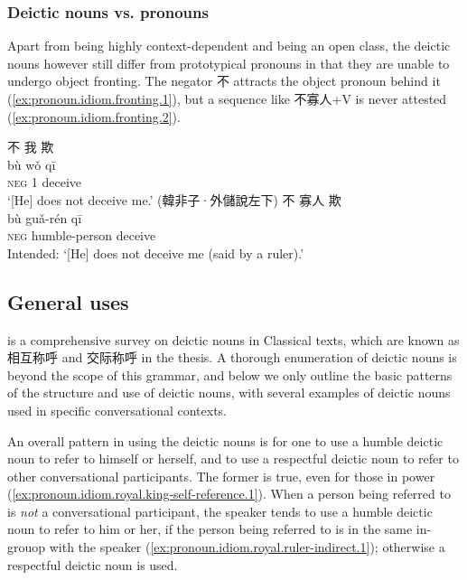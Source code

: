 \documentclass[UTF8, a4paper, oneside, scheme=plain, 12pt]{ctexrep}
\newcommand*{\citepages}[1]{pp.~{#1}}
\newcommand{\translate}[1]{`#1'}
\newcommand*{\category}[1]{\textsc{#1}}
\begin{document}

\subsubsection{Deictic nouns vs. pronouns}

Apart from being highly context-dependent and being an open class,
the deictic nouns however still differ from prototypical pronouns in that 
they are unable to undergo object fronting.
The negator 不 attracts the object pronoun behind it (\ref{ex:pronoun.idiom.fronting.1}),
but a sequence like 不寡人+V is never attested (\ref{ex:pronoun.idiom.fronting.2}).

\begin{exe}
    \ex\label{ex:pronoun.idiom.fronting.1}
    \glll 不 我 欺 \\
    bù wǒ qī \\
    \category{neg} 1 deceive \\
    \glt\translate{[He] does not deceive me.} \hfill (韓非子·外儲說左下)
    \ex\label{ex:pronoun.idiom.fronting.2}
    \glll *不 寡人 欺 \\
    bù guǎ-rén qī \\
    \category{neg} humble-person deceive \\
    \glt Intended: \translate{[He] does not deceive me (said by a ruler).} 
\end{exe}


\subsection{General uses}

\citet[\citepages{125-140}]{wang2005names} is a comprehensive survey on deictic nouns in Classical texts,
which are known as 相互称呼 and 交际称呼 in the thesis.
A thorough enumeration of deictic nouns is beyond the scope of this grammar,
and below we only outline the basic patterns of the structure and use of deictic nouns,
with several examples of deictic nouns used in specific conversational contexts.

An overall pattern in using the deictic nouns is for one to use a humble deictic noun to refer to himself or herself, and to use a respectful deictic noun to refer to other conversational participants.
The former is true, even for those in power (\ref{ex:pronoun.idiom.royal.king-self-reference.1}).
When a person being referred to is \emph{not} a conversational participant,
the speaker tends to use a humble deictic noun to refer to him or her,
if the person being referred to is in the same in-grouop with the speaker (\ref{ex:pronoun.idiom.royal.ruler-indirect.1});
otherwise a respectful deictic noun is used.
\end{document}
